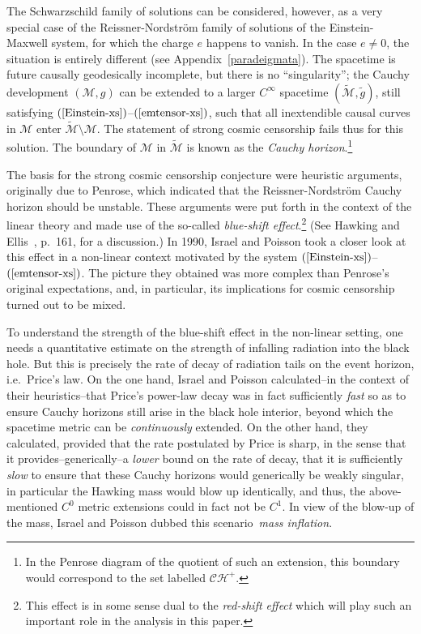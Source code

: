 \documentclass{article}
\begin{document}
The Schwarzschild family of solutions can be considered, however,
as a very special case of the Reissner-Nordstr\"om family of solutions
of the Einstein-Maxwell system,
for which the charge $e$ happens to vanish. 
In the case $e\ne 0$, the situation is entirely different
(see Appendix~\ref{paradeigmata}).
The spacetime is future causally geodesically incomplete, but there is no
``singularity'';
the Cauchy development $(\mathcal{M},g)$ can be extended to a 
larger $C^\infty$  spacetime $(\tilde{\mathcal{M}},\tilde{g})$,
still satisfying $(\ref{Einstein-xs})$--$(\ref{emtensor-xs})$, such that
all inextendible causal curves in $\mathcal{M}$
enter $\tilde{\mathcal{M}}\setminus\mathcal{M}$. 
The statement of strong cosmic censorship fails thus
for this solution.
The boundary of $\mathcal{M}$ in $\tilde{\mathcal{M}}$ is known as  
the \emph{Cauchy horizon}.\footnote{In the Penrose diagram of the quotient
of such an extension, this boundary would correspond to the set
labelled $\mathcal{CH}^+$.}

The basis for the strong cosmic censorship conjecture were heuristic arguments,
originally due to Penrose, which indicated that the
Reissner-Nordstr\"om Cauchy horizon should be unstable.
These arguments were put forth in the context of the linear theory 
and made use of the so-called \emph{blue-shift effect}.\footnote{This effect
is in some sense dual to the \emph{red-shift effect} which will play such 
an important role in the analysis in this paper.} (See
Hawking and Ellis~\cite{he:lssst}, p.~161, for a discussion.)
In 1990, Israel and Poisson took a closer look at this
effect in a non-linear context motivated by the system
$(\ref{Einstein-xs})$--$(\ref{emtensor-xs})$. 
The picture they obtained was more complex than Penrose's original 
expectations,
and, in particular, its implications for cosmic censorship turned 
out to be mixed. 

To understand the strength of the blue-shift effect in the non-linear setting, 
one needs a quantitative estimate on the 
strength of infalling radiation into 
the black hole. But this is precisely the rate of decay of radiation tails
on the event horizon, i.e.~Price's law. 
On the one hand, Israel and Poisson calculated--in the context
of their heuristics--that  
Price's power-law decay was in fact sufficiently \emph{fast} so as 
to ensure Cauchy horizons still arise in the black hole interior, 
beyond which the spacetime metric can be \emph{continuously} extended.
On the other hand, they calculated, provided that the rate postulated by Price is
sharp, in the sense that it provides--generically--a \emph{lower} bound
on the rate of decay, that it is sufficiently
\emph{slow} to ensure that these Cauchy horizons would generically 
be weakly singular, in particular the Hawking mass would blow up identically,
and thus, the above-mentioned $C^0$ metric extensions could in fact not be 
$C^1$. In view of the blow-up of the mass, Israel and Poisson dubbed this
scenario~\emph{mass inflation}.
\end{document}
